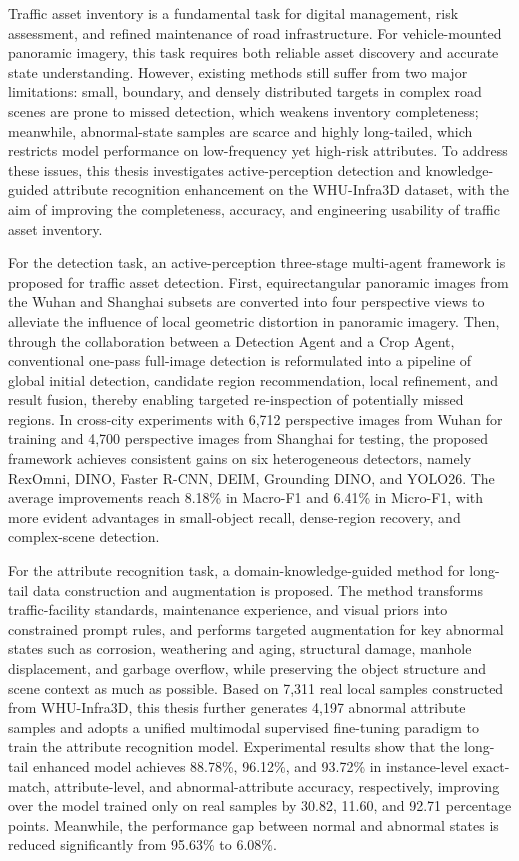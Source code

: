 Traffic asset inventory is a fundamental task for digital management, risk assessment, and refined maintenance of road infrastructure. For vehicle-mounted panoramic imagery, this task requires both reliable asset discovery and accurate state understanding. However, existing methods still suffer from two major limitations: small, boundary, and densely distributed targets in complex road scenes are prone to missed detection, which weakens inventory completeness; meanwhile, abnormal-state samples are scarce and highly long-tailed, which restricts model performance on low-frequency yet high-risk attributes. To address these issues, this thesis investigates active-perception detection and knowledge-guided attribute recognition enhancement on the WHU-Infra3D dataset, with the aim of improving the completeness, accuracy, and engineering usability of traffic asset inventory.

For the detection task, an active-perception three-stage multi-agent framework is proposed for traffic asset detection. First, equirectangular panoramic images from the Wuhan and Shanghai subsets are converted into four perspective views to alleviate the influence of local geometric distortion in panoramic imagery. Then, through the collaboration between a Detection Agent and a Crop Agent, conventional one-pass full-image detection is reformulated into a pipeline of global initial detection, candidate region recommendation, local refinement, and result fusion, thereby enabling targeted re-inspection of potentially missed regions. In cross-city experiments with 6,712 perspective images from Wuhan for training and 4,700 perspective images from Shanghai for testing, the proposed framework achieves consistent gains on six heterogeneous detectors, namely RexOmni, DINO, Faster R-CNN, DEIM, Grounding DINO, and YOLO26. The average improvements reach 8.18\% in Macro-F1 and 6.41\% in Micro-F1, with more evident advantages in small-object recall, dense-region recovery, and complex-scene detection.

For the attribute recognition task, a domain-knowledge-guided method for long-tail data construction and augmentation is proposed. The method transforms traffic-facility standards, maintenance experience, and visual priors into constrained prompt rules, and performs targeted augmentation for key abnormal states such as corrosion, weathering and aging, structural damage, manhole displacement, and garbage overflow, while preserving the object structure and scene context as much as possible. Based on 7,311 real local samples constructed from WHU-Infra3D, this thesis further generates 4,197 abnormal attribute samples and adopts a unified multimodal supervised fine-tuning paradigm to train the attribute recognition model. Experimental results show that the long-tail enhanced model achieves 88.78\%, 96.12\%, and 93.72\% in instance-level exact-match, attribute-level, and abnormal-attribute accuracy, respectively, improving over the model trained only on real samples by 30.82, 11.60, and 92.71 percentage points. Meanwhile, the performance gap between normal and abnormal states is reduced significantly from 95.63\% to 6.08\%.

